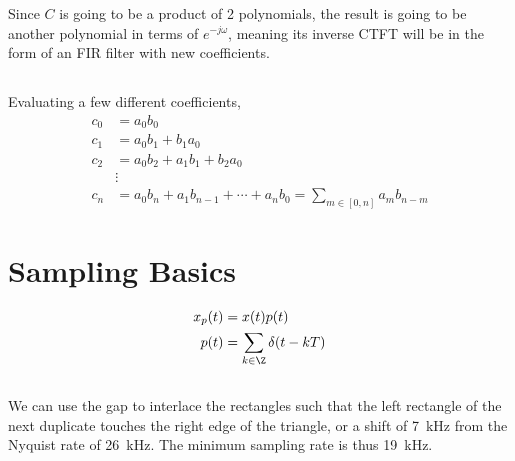 \documentclass{article}
\begin{document}
\subsubsection{}

Since \(C\) is going to be a product of 2 polynomials, the result is going to be another polynomial in terms of \(e^{-j \omega}\), meaning its inverse CTFT will be in the form of an FIR filter with new coefficients.

\subsection{}

Evaluating a few different coefficients,
\begin{align}
    c_0 &= a_0 b_0 \\
    c_1 &= a_0 b_1 + b_1 a_0 \\
    c_2 &= a_0 b_2 + a_1 b_1 + b_2 a_0 \\
    &\vdots \\
    c_n &= a_0 b_n + a_1 b_{n - 1} + \cdots + a_n b_0 = \sum_{m \in [0, n]} a_m b_{n - m}
\end{align}

\section{Sampling Basics}

\begin{align}
    x_p(t) &= x(t) p(t) \\
    p(t) &= \sum_{k \in \Z} \delta(t - kT)
\end{align}

\subsection{}

We can use the gap to interlace the rectangles such that the left rectangle of the next duplicate touches the right edge of the triangle, or a shift of \SI{7}{\kilo\hertz} from the Nyquist rate of \SI{26}{\kilo\hertz}.
The minimum sampling rate is thus \SI{19}{\kilo\hertz}.

\subsection{}
\end{document}
